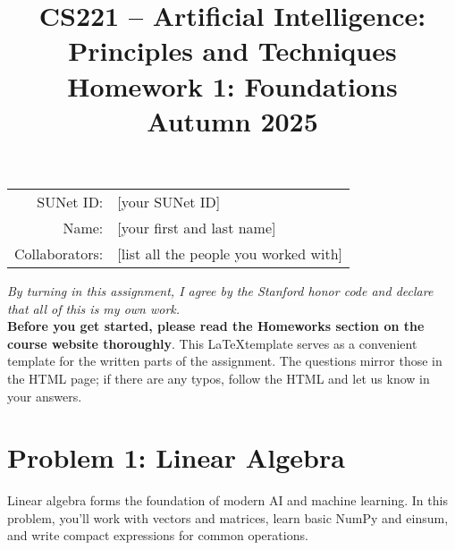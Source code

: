\documentclass{article}
\title{\textbf{CS221 -- Artificial Intelligence: \\Principles and Techniques}\\Homework 1: Foundations\\Autumn 2025}
\date{}
\theoremstyle{case}
\theoremstyle{definition}
\begin{document}
\maketitle

\begin{center}
\begin{tabular}{rl}
SUNet ID: & [your SUNet ID] \\
Name: & [your first and last name] \\
Collaborators: & [list all the people you worked with]
\end{tabular}
\end{center}

\textit{By turning in this assignment, I agree by the Stanford honor code and declare that all of this is my own work.} \\

\textbf{Before you get started, please read the Homeworks section on the course website thoroughly}. This \LaTeX template serves as a convenient template for the written parts of the assignment. The questions mirror those in the HTML page; if there are any typos, follow the HTML and let us know in your answers.

\section*{Problem 1: Linear Algebra}
Linear algebra forms the foundation of modern AI and machine learning. In this problem, you'll work with vectors and matrices, learn basic NumPy and einsum, and write compact expressions for common operations.
\end{document}
